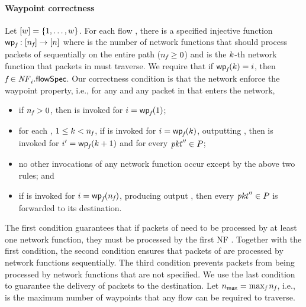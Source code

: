\paragraph{Waypoint correctness}
Let $[{w}] = \{1, \ldots, w\}$.  For each flow
\flowID{}, there is a specified injective function $\wpFn{\flowID{}}:
\nats{\wpNmbr{\flowID{}}} \rightarrow \nats{\nfNmbr}$ where
\wpNmbr{\flowID{}} is the number of network functions that should process packets of \flowID{} sequentially on the entire path ($\wpNmbr{\flowID{}} \ge 0$) and \wpFn{\flowID{}}{\wpIdx} is the
$k$-th network function that packets in \flowID{} must traverse.
We require that if $\wpFn{\flowID{}}{\wpIdx} = \nfIdx$, then
$\flowID{} \in \nfID{\nfIdx}{}{\flowSpec}$.  Our correctness condition
is that the network enforce the waypoint property, i.e., for any
\flowID{} and any packet \pktID{} in \flowID{} that enters the
network,
\begin{itemize}[nosep,leftmargin=1em,labelwidth=*,align=left]
  \item if $\wpNmbr{\flowID{}} > 0$, then
    \nfID{\nfIdx}{}{\processPkt{\pktID{}}} is invoked for $\nfIdx =
    \wpFn{\flowID{}}{1}$;
  \item for each \wpIdx, $1 \le \wpIdx < \wpNmbr{\flowID{}}$, if
    \nfID{\nfIdx}{}{\processPkt{\pktIDAlt{}}} is invoked for $\nfIdx =
    \wpFn{\flowID{}}{\wpIdx}$, outputting \pktSet,
    then \nfID{\nfIdxAlt}{}{\processPkt{\pktIDAltAlt{}}} is invoked
    for $\nfIdxAlt = \wpFn{\flowID{}}{\wpIdx+1}$ and for every
    $\pktIDAltAlt{} \in \pktSet$;
  \item no other invocations of any network function occur except by
    the above two rules; and
  \item if \nfID{\nfIdx}{}{\processPkt{\pktIDAlt{}}} is invoked for
    $\nfIdx = \wpFn{\flowID{}}{\wpNmbr{\flowID{}}}$, producing output
    \pktSet, then every $\pktIDAltAlt{} \in \pktSet$ is forwarded to
    its destination.
\end{itemize}
The first condition guarantees that if packets of \flowID{} need to be processed by at least one network function, they must be processed by the first NF . Together with the first condition, the second condition ensures that packets of \flowID{} are processed by network functions sequentially. The third condition prevents packets from being processed by network functions that are not specified. We use the last condition to guarantee the delivery of packets to the destination.
Let $\wpNmbrMax = \max_{\flowID{}} \wpNmbr{\flowID{}}$, i.e.,
\wpNmbrMax is the maximum number of waypoints that any flow can be
required to traverse.


